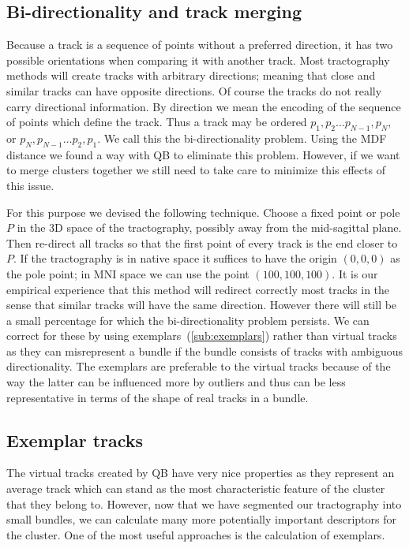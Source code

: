 \documentclass[preprint,authoryear,a4paper,10pt,onecolumn]{elsarticle}
\begin{document}
\subsection{Bi-directionality and track merging\label{sub:The-bi-directionality-problem}}

Because a track is a sequence of points without a preferred direction,
it has two possible orientations when comparing it with another track.
Most tractography methods will create tracks with arbitrary directions;
meaning that close and similar tracks can have opposite directions.  Of
course the tracks do not really carry directional information.  By
direction we mean the encoding of the sequence of points which define
the track. Thus a track may be ordered $p_{1},p_{2}\ldots
p_{N-1},p_{N}$, or $p_{N},p_{N-1}\ldots p_{2},p_{1}$. We call this the
bi-directionality problem. Using the MDF distance we found a way with QB
to eliminate this problem. However, if we want to merge clusters
together we still need to take care to minimize this effects of this issue.

For this purpose we devised the following technique. Choose a fixed
point or pole $P$ in the 3D space of the tractography, possibly away
from the mid-sagittal plane. Then re-direct all tracks so that the first
point of every track is the end closer to $P$. If the tractography is in
native space it suffices to have the origin $(0,0,0)$ as the pole point;
in MNI space we can use the point $(100,100,100)$. It is our empirical
experience that this method will redirect correctly most tracks in the
sense that similar tracks will have the same direction.  However there
will still be a small percentage for which the bi-directionality problem
persists. We can correct for these by using
exemplars~(\ref{sub:exemplars}) rather than virtual tracks as they can
misrepresent a bundle if the bundle consists of tracks with ambiguous
directionality. The exemplars are preferable to the virtual tracks
because of the way the latter can be influenced more by outliers and
thus can be less representative in terms of the shape of real tracks in
a bundle.

\subsection{Exemplar tracks\label{sub:exemplars}}

The virtual tracks created by QB have very nice properties as they
represent an average track which can stand as the most characteristic
feature of the cluster that they belong to. However, now that we have
segmented our tractography into small bundles, we can calculate many more
potentially important descriptors for the cluster. One of the most
useful approaches is the calculation of exemplars.
\end{document}
